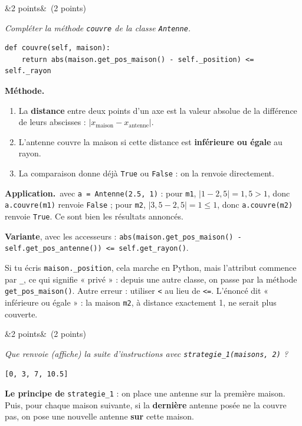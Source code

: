 \documentclass[11pt, a4paper]{exam}
\newcommand{\code}[1]{\texttt{#1}}
\newcommand{\Q}[3]{\par\needspace{5\baselineskip}\bigskip\noindent{\large\bfseries Question #1}\ifx&#2&\else\ \textnormal{(#2)}\fi\par\nopagebreak\smallskip\noindent\textit{#3}\par\nopagebreak\smallskip}
\newcommand{\methode}{\par\noindent\textbf{Méthode.}\ }
\newcommand{\application}{\par\noindent\textbf{Application.}\ }
\begin{document}
\Q{8}{2 points}{Compléter la méthode \code{couvre} de la classe \code{Antenne}.}
\begin{reponse}
\begin{lstlisting}
def couvre(self, maison):
    return abs(maison.get_pos_maison() - self._position) <= self._rayon
\end{lstlisting}
\end{reponse}
\methode
\begin{enumerate}
\item La \textbf{distance} entre deux points d'un axe est la valeur absolue de la différence de leurs abscisses : $|x_{\text{maison}} - x_{\text{antenne}}|$.
\item L'antenne couvre la maison si cette distance est \textbf{inférieure ou égale} au rayon.
\item La comparaison donne déjà \code{True} ou \code{False} : on la renvoie directement.
\end{enumerate}
\application avec \code{a = Antenne(2.5, 1)} : pour \code{m1}, $|1 - 2{,}5| = 1{,}5 > 1$, donc \code{a.couvre(m1)} renvoie \code{False} ; pour \code{m2}, $|3{,}5 - 2{,}5| = 1 \leq 1$, donc \code{a.couvre(m2)} renvoie \code{True}. Ce sont bien les résultats annoncés.

\textbf{Variante}, avec les accesseurs : \code{abs(maison.get\_pos\_maison() - self.get\_pos\_antenne()) <= self.get\_rayon()}.
\begin{erreur}
Si tu écris \code{maison.\_position}, cela marche en Python, mais l'attribut commence par \code{\_}, ce qui signifie « privé » : depuis une autre classe, on passe par la méthode \code{get\_pos\_maison()}. Autre erreur : utiliser \code{<} au lieu de \code{<=}. L'énoncé dit « inférieure ou égale » : la maison \code{m2}, à distance exactement 1, ne serait plus couverte.
\end{erreur}

\Q{9}{2 points}{Que renvoie (affiche) la suite d'instructions avec \code{strategie\_1(maisons, 2)} ?}
\begin{reponse}
\code{[0, 3, 7, 10.5]}
\end{reponse}
\textbf{Le principe de} \code{strategie\_1} : on place une antenne sur la première maison. Puis, pour chaque maison suivante, si la \textbf{dernière} antenne posée ne la couvre pas, on pose une nouvelle antenne \textbf{sur} cette maison.
\end{document}
